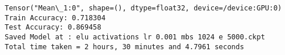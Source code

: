 \documentclass[11pt]{article}
\begin{document}
    \begin{Verbatim}[commandchars=\\\{\}]
Tensor("Mean\_1:0", shape=(), dtype=float32, device=/device:GPU:0)
Train Accuracy: 0.718304
Test Accuracy: 0.869458
Saved Model at : elu activations lr 0.001 mbs 1024 e 5000.ckpt
Total time taken = 2 hours, 30 minutes and 4.7961 seconds

    \end{Verbatim}


    
    
    
    
\end{document}

